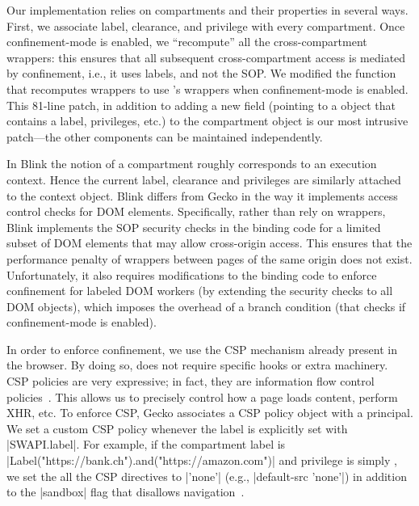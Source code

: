 Our implementation relies on compartments and their properties in
several ways.
%
First, we associate label, clearance, and privilege with every 
compartment.
%
Once confinement-mode is enabled, we ``recompute'' all the
cross-compartment wrappers: this ensures that all subsequent
cross-compartment access is mediated by confinement, i.e., it uses
labels, and not the SOP. %
%
We modified the function that recomputes wrappers to use \sys{}'s
wrappers when confinement-mode is enabled.
%
This 81-line patch, in addition to adding a new field (pointing to a \sys{}
object that contains a label, privileges, etc.) to the compartment
object is our most intrusive patch---the other \sys{} components can be
maintained independently.

In Blink the notion of a compartment roughly corresponds to an
execution context.
%
Hence the current label, clearance and privileges are similarly
attached to the context object. 
%
Blink differs from Gecko in the way it implements access control checks for
DOM elements. 
%
Specifically, rather than rely on wrappers, Blink implements the SOP security
checks in the binding code for a limited subset of DOM elements that may allow
cross-origin access.
%
This ensures that the performance penalty of wrappers between pages of the same
origin does not exist.
%
Unfortunately, it also requires modifications to the binding code to
enforce confinement for labeled DOM workers (by extending the security
checks to all DOM objects), which imposes the overhead of a branch
condition (that checks if confinement-mode is enabled).

 
%
In order to enforce confinement, we use the CSP mechanism already present 
in the browser. 
By doing so, \sys{} does not require specific hooks or extra machinery. 
CSP policies are very expressive; in fact, they are
information flow control policies~\cite{yang:2013:towards}. This allows us
to precisely control how a page loads content, perform XHR, etc.
To enforce CSP, Gecko associates a CSP policy object with a principal.
%
We set a custom CSP policy whenever the label is
explicitly set with \js|SWAPI.label|.
%
For example, if the compartment label is
\js|Label("https://bank.ch").and("https://amazon.com")| and privilege
is simply , we set the all the CSP directives to
\js|'none'| (e.g., \js|default-src 'none'|) in addition to the
\js|sandbox| flag that disallows
navigation~\cite{csp1.1,whatwg-html,html5}.
%

